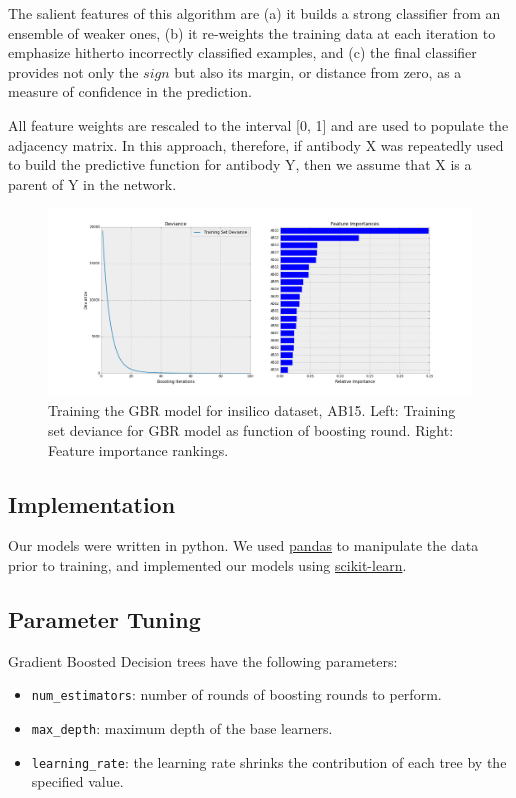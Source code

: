 \documentclass[letterpaper, 11pt]{article}
\begin{document}
The salient features of this algorithm are (a) it builds a strong classifier from an ensemble of weaker ones, (b) it re-weights the training data at each iteration to emphasize hitherto incorrectly classified examples, and (c) the final classifier provides not only the $sign$ but also its margin, or distance from zero, as a measure of confidence in the prediction.

All feature weights are rescaled to the interval [0, 1] and are used to populate the adjacency matrix. In this approach, therefore, if antibody X was repeatedly used to build the predictive function for antibody Y, then we assume that X is a parent of Y in the network.

\begin{figure}
  \centering
  \includegraphics[width=1.0\textwidth]{deviance_feature_importance.png}
  \caption{Training the GBR model for insilico dataset, AB15. Left: Training set deviance for GBR model as function of boosting round. Right: Feature importance rankings.}
\end{figure}
\subsection{Implementation}

Our models were written in python. We used \href{http://pandas.pydata.org/}{pandas} to manipulate the data prior to training, and implemented our models using \href{http://scikit-learn.org/stable/}{scikit-learn}.

\subsection{Parameter Tuning}

Gradient Boosted Decision trees have the following parameters:
\begin{itemize}
  \item \texttt{num\_estimators}: number of rounds of boosting rounds to perform.
  \item \texttt{max\_depth}: maximum depth of the base learners.
  \item \texttt{learning\_rate}: the learning rate shrinks the contribution of each tree by the specified value.
\end{itemize}
\end{document}
